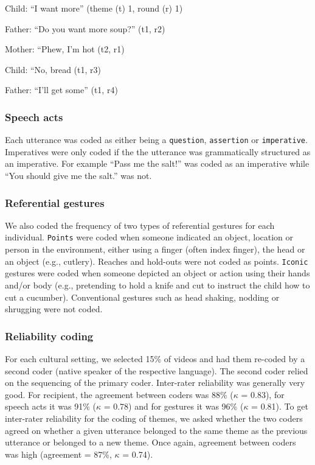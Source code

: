 \documentclass[
  man,floatsintext]{apa6}
\begin{document}
Child: ``I want more'' (theme (t) 1, round (r) 1)

Father: ``Do you want more soup?'' (t1, r2)

Mother: ``Phew, I'm hot (t2, r1)

Child: ``No, bread (t1, r3)

Father: ``I'll get some'' (t1, r4)

\hypertarget{speech-acts}{%
\subsubsection{Speech acts}\label{speech-acts}}

Each utterance was coded as either being a \texttt{question}, \texttt{assertion} or \texttt{imperative}. Imperatives were only coded if the the utterance was grammatically structured as an imperative. For example ``Pass me the salt!'' was coded as an imperative while ``You should give me the salt.'' was not.

\hypertarget{referential-gestures}{%
\subsubsection{Referential gestures}\label{referential-gestures}}

We also coded the frequency of two types of referential gestures for each individual. \texttt{Points} were coded when someone indicated an object, location or person in the environment, either using a finger (often index finger), the head or an object (e.g., cutlery). Reaches and hold-outs were not coded as points. \texttt{Iconic} gestures were coded when someone depicted an object or action using their hands and/or body (e.g., pretending to hold a knife and cut to instruct the child how to cut a cucumber). Conventional gestures such as head shaking, nodding or shrugging were not coded.

\hypertarget{reliability-coding}{%
\subsubsection{Reliability coding}\label{reliability-coding}}

For each cultural setting, we selected 15\% of videos and had them re-coded by a second coder (native speaker of the respective language). The second coder relied on the sequencing of the primary coder. Inter-rater reliability was generally very good. For recipient, the agreement between coders was 88\% (\(\kappa\) = 0.83), for speech acts it was 91\% (\(\kappa\) = 0.78) and for gestures it was 96\% (\(\kappa\) = 0.81). To get inter-rater reliability for the coding of themes, we asked whether the two coders agreed on whether a given utterance belonged to the same theme as the previous utterance or belonged to a new theme. Once again, agreement between coders was high (agreement = 87\%, \(\kappa\) = 0.74).
\end{document}
